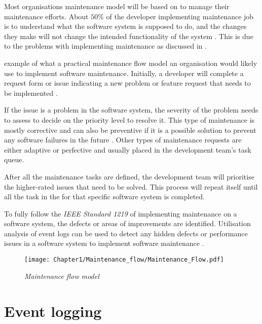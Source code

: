 Most organisations maintenance model will be based on  to manage their maintenance efforts. About $50\%$ of the developer implementing maintenance job is to understand what the software system is supposed to do, and the changes they make will not change the intended functionality of the system \cite{Tang2010, Zhuo}. This is due to the problems with implementing maintenance as discussed in .\par {} example of what a practical maintenance flow model an organisation would likely use to implement software maintenance. Initially, a developer will complete a request form or issue indicating a new problem or feature request that needs to be implemented \cite{Tang2010}.\par If the issue is a problem in the software system, the severity of the problem needs to assess to decide on the priority level to resolve it. This type of maintenance is mostly corrective and can also be preventive if it is a possible solution to prevent any software failures in the future \cite{Tang2010}. Other types of maintenance requests are either adaptive or perfective and usually placed in the development team's task queue.\par After all the maintenance tasks are defined, the development team will prioritise the higher-rated issues that need to be solved. This process will repeat itself until all the task in the for that specific software system is completed.\par To fully follow the \textit{IEEE Standard 1219} of implementing maintenance on a software system, the defects or areas of improvements are identified. Utilisation analysis of event logs can be used to detect any hidden defects or performance issues in a software system to implement software maintenance \cite{Cinque2013, Rong2018a, Levin2019}.

\begin{figure}[!htb] %
	\centering %
	\texttt{[image: Chapter1/Maintenance\_flow/Maintenance\_Flow.pdf]}
	\caption[Maintenance flow model]
	{\textit{Maintenance flow model \cite{Tang2010}}} \label{fig:CH1_MaintenanceFlow}
\end{figure}

\clearpage

\section{Event logging}\label{sec:EventLogging}

